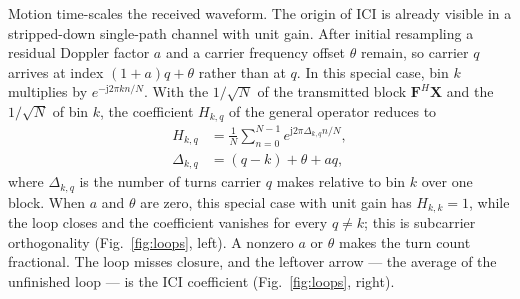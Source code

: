 \documentclass[conference]{IEEEtran}
\begin{document}
Motion time-scales the received waveform.  The origin of ICI is already
visible in a stripped-down single-path channel with unit gain.  After initial
resampling a residual Doppler factor \(a\) and a carrier frequency offset
\(\theta\) remain, so carrier \(q\) arrives at index \((1+a)q+\theta\)
rather than at \(q\).  In this special case, bin \(k\) multiplies by
\(e^{-\mathrm j2\pi kn/N}\).  With the \(1/\sqrt N\) of the transmitted
block \(\mathbf F^{H}\mathbf X\) and the \(1/\sqrt N\) of bin \(k\), the
coefficient \(H_{k,q}\) of the general operator reduces to
\begin{align}
  H_{k,q}
  &=
  \frac{1}{N}\sum_{n=0}^{N-1}
  e^{\mathrm j2\pi\Delta_{k,q}n/N},
  \label{eq:ici-coefficient}\\
  \Delta_{k,q}
  &=
  (q-k)+\theta+aq,
  \label{eq:leftover-turns}
\end{align}
where \(\Delta_{k,q}\) is the number of turns carrier \(q\) makes
relative to bin \(k\) over one block.  When \(a\) and \(\theta\) are zero,
this special case with unit gain has \(H_{k,k}=1\), while the loop closes and the
coefficient vanishes for every \(q\neq k\); this is subcarrier orthogonality
(Fig.~\ref{fig:loops}, left).  A nonzero \(a\) or \(\theta\) makes the
turn count fractional.  The loop misses closure, and the leftover arrow ---
the average of the unfinished loop --- is the ICI coefficient
(Fig.~\ref{fig:loops}, right).
\end{document}

